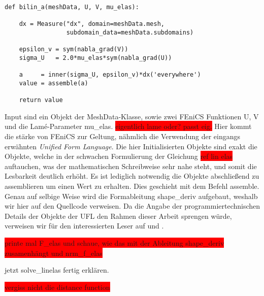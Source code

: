\documentclass[bibliography=totoc,12pt,a4paper]{scrartcl}
\theoremstyle{exampstyle}
\numberwithin{equation}{section}
\begin{document}
\begin{lstlisting}
def bilin_a(meshData, U, V, mu_elas):

    dx = Measure("dx", domain=meshData.mesh, 
                 subdomain_data=meshData.subdomains)

    epsilon_v = sym(nabla_grad(V))
    sigma_U   = 2.0*mu_elas*sym(nabla_grad(U))

    a     = inner(sigma_U, epsilon_v)*dx('everywhere')
    value = assemble(a)

    return value

\end{lstlisting}
Input sind ein Objekt der \textsf{MeshData}-Klasse, sowie zwei FEniCS Funktionen \textsf{U, V} und die Lamé-Parameter \textsf{mu\_elas}. \colorbox{red}{eigentlich lame oder? passt eig.} Hier kommt die stärke von FEniCS zur Geltung, nähmlich die Verwendung der eingangs erwähnten \textit{Unified Form Language}. Die hier Initialisierten Objekte sind exakt die Objekte, welche in der schwachen Formulierung der Gleichung \colorbox{red}{ref lin elas} auftauchen, was der mathematischen Schreibweise sehr nahe steht, und somit die Lesbarkeit deutlich erhöht. Es ist lediglich notwendig die Objekte abschließend zu assemblieren um einen Wert zu erhalten. Dies geschieht mit dem Befehl \textsf{assemble}. Genau auf selbige Weise wird die Formableitung \textsf{shape\_deriv} aufgebaut, weshalb wir hier auf den Quellcode verweisen. Da die Angabe der programmiertechnischen Details der Objekte der UFL den Rahmen dieser Arbeit sprengen würde, verweisen wir für den interessierten Leser auf \cite{fenics} und \cite{Unifiedformlanguage}.

\colorbox{red}{printe mal F\_elas und schaue, wie das mit der Ableitung shape\_deriv zusamenhängt und nrm\_f\_elas}

jetzt solve\_linelas fertig erklären.

\colorbox{red}{vergiss nicht die distance function}


\newpage
\nocite{*}


\end{document}
